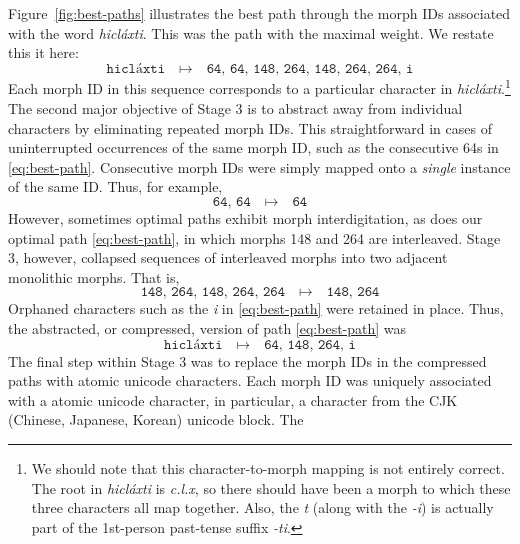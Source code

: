 {Figure~\ref{fig:best-paths} illustrates the 
 best path through the morph IDs associated with the word \textit{hicl\'{a}xti}. This was the path with
 the maximal weight.
 We restate this it here:
\begin{equation}\label{eq:best-path} 
\texttt{hicl\'{a}xti} \quad \mapsto \quad \texttt{64, 64, 148, 264, 148, 264, 264, i}
\end{equation}
Each morph ID in this sequence corresponds to a particular character in \textit{hicl\'{a}xti}.\footnote{We should note that this character-to-morph mapping is not entirely correct. The root in \textit{hicl\'{a}xti} is \textit{c.l.x}, so there should have been a morph to which these three characters all map together. Also, the \textit{t} (along with the \textit{-i}) is actually part of the 1st-person past-tense suffix \textit{-ti}.}
The second major objective of Stage 3 is to abstract away from individual 
characters by eliminating repeated morph IDs. 
This straightforward in cases of uninterrupted 
occurrences of the same morph ID, such as the consecutive 64s in \eqref{eq:best-path}. 
Consecutive morph IDs were simply mapped onto a \emph{single} instance of the same ID. Thus, for example,
\begin{equation*}
\texttt{64, 64} \quad \mapsto \quad \texttt{64}
\end{equation*}
However, sometimes optimal paths
exhibit morph interdigitation, as does our optimal path \eqref{eq:best-path}, in which morphs 148 and 264 are interleaved. 
Stage 3, however, collapsed sequences of interleaved morphs into two adjacent monolithic
morphs. That is,
\begin{equation*}
\texttt{148, 264, 148, 264, 264} \quad \mapsto \quad \texttt{148, 264}
\end{equation*}
Orphaned characters such as the \textit{i} in \eqref{eq:best-path} 
were retained in place. Thus, the abstracted, or compressed, version of path \eqref{eq:best-path} was
\begin{equation}\label{eq:reduced-best-path}
\texttt{hicl\'{a}xti} \quad \mapsto \quad \texttt{64, 148, 264, i}
\end{equation}
The final step within Stage 3 was to replace the morph IDs in the compressed paths 
with atomic unicode characters. Each morph ID was uniquely associated with a atomic unicode character, in particular, a character 
from the CJK (Chinese, Japanese, Korean) unicode block. The 
}
